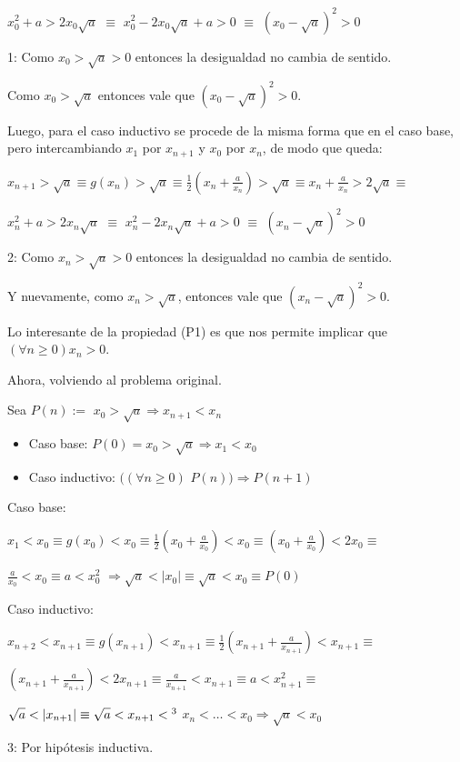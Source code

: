 \hspace{4cm}$\displaystyle  x_{0}^2+ a > 2x_{0}\sqrt{a}$ \footnotemark[1] $\equiv$	$x_{0}^2 - 2x_{0}\sqrt{a} + a > 0$ $\equiv$ $\left(x_{0} - \sqrt{a}\right)^2 > 0$

1: Como $x_0 > \sqrt{a} > 0$ entonces la desigualdad no cambia de sentido.

Como $x_0 > \sqrt{a}$ entonces vale que $\left(x_{0} - \sqrt{a}\right)^2 > 0$.

Luego, para el caso inductivo se procede de la misma forma que en el caso base, pero intercambiando $x_1$ por $x_{n+1}$ y $x_0$ por $x_n$, de modo que queda:

\hspace{4cm}$\displaystyle  x_{n+1} > \sqrt{a} \equiv g(x_n) > \sqrt{a} \equiv \frac{1}{2}\left(x_n+ \frac{a}{x_n}\right) > \sqrt{a} \equiv x_n+ \frac{a}{x_n} > 2\sqrt{a}\equiv$


\hspace{4cm}$\displaystyle  x_{n}^2+ a > 2x_{n}\sqrt{a}$ \footnotemark[2] $\equiv$	$x_{n}^2 - 2x_{n}\sqrt{a} + a > 0$ $\equiv$ $\left(x_{n} - \sqrt{a}\right)^2 > 0$


2: Como $x_n > \sqrt{a} > 0$ entonces la desigualdad no cambia de sentido.

Y nuevamente, como $x_n > \sqrt{a}$, entonces vale que $\left(x_{n} - \sqrt{a}\right)^2 > 0$.

Lo interesante de la propiedad (P1) es que nos permite implicar que $(\forall n \geq 0) x_n > 0$.

Ahora, volviendo al problema original.

Sea $P(n):=$ $x_0 > \sqrt{a} \Rightarrow x_{n+1} < x_{n}$
\begin{itemize}
	\item Caso base: $P(0) = x_0 > \sqrt{a} \Rightarrow x_1 < x_0$
	\item Caso inductivo: $((\forall n\geq 0)$ $P(n)) \Rightarrow P(n+1)$
\end{itemize}

Caso base:


\hspace{4cm}$\displaystyle x_1 < x_0 \equiv g(x_0) < x_0 \equiv \frac{1}{2}\left(x_0 + \frac{a}{x_0}\right) < x_0 \equiv \left(x_0 + \frac{a}{x_0}\right) < 2x_0 \equiv$


\hspace{4.5cm}$\displaystyle \frac{a}{x_0} < x_0 \equiv a < x_{0}^2$ $\Rightarrow \sqrt{a} < |x_0| \equiv \sqrt{a} < x_0 \equiv P(0)$

Caso inductivo:
 
\hspace{4cm}$\displaystyle  x_{n+2} < x_{n+1} \equiv g(x_{n+1}) < x_{n+1} \equiv \frac{1}{2}\left(x_{n+1} + \frac{a}{x_{n+1}}\right) < x_{n+1} \equiv $


\hspace{4cm}$\displaystyle  \left(x_{n+1} + \frac{a}{x_{n+1}}\right) < 2x_{n+1} \equiv \frac{a}{x_{n+1}} < x_{n+1} \equiv a < x_{n+1}^2 \equiv $


\hspace{4cm}$\displaystyle  \sqrt{a} < |x_{n+1}| \equiv \sqrt{a} < x_{n+1} <\footnotemark[3]$  $x_n < \ldots < x_0 \Rightarrow \sqrt{a} < x_0$


3: Por hip\'otesis inductiva.